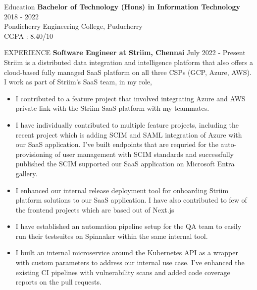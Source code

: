 \documentclass{template}
\begin{document}
\begin{rSection}{Education}
{\bf Bachelor of Technology (Hons) in Information Technology} \hfill {2018 - 2022}
\\ 
Pondicherry Engineering College, Puducherry \\
CGPA : 8.40/10


\end{rSection}

\begin{rSection}{EXPERIENCE}
\textbf{Software Engineer at Striim, Chennai} \hfill July 2022 - Present \\
Striim is a distributed data integration and intelligence platform that also offers a cloud-based fully managed SaaS platform on all three CSPs (GCP, Azure, AWS). I work as part of Striim's SaaS team, in my role,

\begin{itemize}
    \item I contributed to a feature project that involved integrating Azure and AWS private link with the Striim SaaS platform with my teammates.

    \item I have individually contributed to multiple feature projects, including the recent project which is adding SCIM and SAML integration of Azure with our SaaS application. I've built endpoints that are requried for the auto-provisioning of user management with SCIM standards and successfully published the SCIM supported our SaaS application on Microsoft Entra gallery.

    \item I enhanced our internal release deployment tool for onboarding Striim platform solutions to our SaaS application. I have also contributed to few of the frontend projects which are based out of Next.js

    \item I have established an automation pipeline setup for the QA team to easily run their testsuites on Spinnaker within the same internal tool.

    \item I built an internal microservice around the Kubernetes API as a wrapper with custom parameters to address our internal use case. I've enhanced the existing CI pipelines with vulnerability scans and added code coverage reports on the pull requests.


\end{itemize}
\end{rSection}
\end{document}
